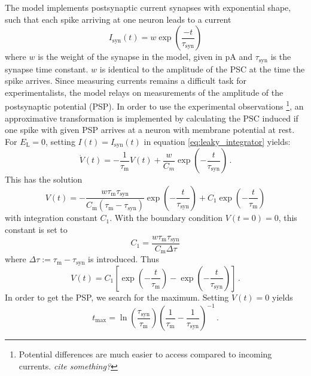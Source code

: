The model implements  
postsynaptic current synapses with exponential shape, such that each 
spike arriving at one neuron leads to a current 
\begin{equation}
I_{\text{syn}}(t) = w \exp{\left(\frac{-t}{\tau_\text{syn}}\right)}	
    \label{eq:synaptic_current}
\end{equation}
where $w$ is the weight of the synapse in the model, given in pA
and $\tau_\text{syn}$ is the synapse time constant.
$w$ is identical to the amplitude of the PSC
at the time the spike arrives. 
Since measuring currents remains a difficult task for experimentalists, 
the model relays on measurements of the amplitude of the postsynaptic 
potential (PSP). In order to use the experimental observations%
\footnote{
Potential differences are much easier to access compared to incoming currents.
\emph{cite something?}
}, 
an approximative transformation is implemented 
by calculating the PSC induced if one spike with given PSP arrives at 
a neuron with membrane potential at rest. 
For $E_\text{L} = 0$, setting $I(t) = I_\text{syn}(t)$ in equation \eqref{eq:leaky_integrator}
yields:
\begin{equation}
    \dot{V}(t)
    = - \frac{1}{\tau_\text{m}} V(t) + \frac{w}{C_m} \exp{\left(-\frac{t}{\tau_\text{syn}}\right)} \,.
    \label{eq:psc_ode}
\end{equation}
This has the solution 
\begin{equation}
    V(t) =   
        - \frac{w \tau_\text{m} \tau_\text{syn}} {C_\text{m} \left(\tau_\text{m} - \tau_\text{syn}\right)}	
        \exp{\left( -\frac{t}{\tau_\text{syn}} \right)} 
        + C_1 \exp{\left(-\frac{t}{\tau_\text{m}} \right)}
    \label{eq:psc_ode_sol}
\end{equation}
with integration constant $C_1$.
With the boundary condition $V(t = 0) = 0$, this constant is set to
\begin{equation}
    C_1 = \frac{w \tau_\text{m} \tau_\text{syn}}{C_\text{m} \Delta\tau}	
    \label{eq:C_1}
\end{equation}
where $\Delta\tau := \tau_\text{m} - \tau_\text{syn}$ is introduced.
Thus
\begin{equation}
    V(t) = C_1 \left[\exp\left(-\frac{t}{\tau_\text{m}}\right) - \exp\left(-\frac{t}{\tau_\text{syn}}\right)\right]	\,.  
    \label{eq:V(t)}
\end{equation}
In order to get the PSP, we search for the maximum. Setting $\dot{V}(t) = 0$ 
yields
\begin{equation}
    t_\text{max} 
        = \ln{\!\left(\frac{\tau_\text{syn}}{\tau_\text{m}}\right)} 
            \left(\frac{1}{\tau_\text{m}} - \frac{1}{\tau_\text{syn}}\right)^{-1} \,.
    \label{eq:t_max}
\end{equation}
